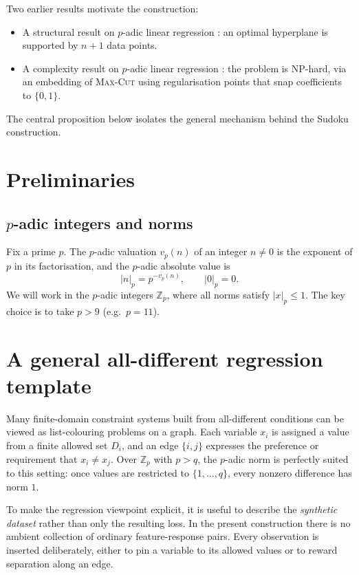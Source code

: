 \documentclass[11pt]{article}
\begin{document}
Two earlier results motivate the construction:
\begin{itemize}
    \item A structural result on $p$-adic linear regression \cite{baker2025padic}: an optimal hyperplane is supported by $n+1$ data points.
    \item A complexity result on $p$-adic linear regression \cite{baker2026nphard}: the problem is NP-hard, via an embedding of \textsc{Max-Cut} using regularisation points that snap coefficients to $\{0,1\}$.
\end{itemize}
The central proposition below isolates the general mechanism behind the Sudoku construction.

\section{Preliminaries}

\subsection{$p$-adic integers and norms}
Fix a prime $p$. The $p$-adic valuation $v_p(n)$ of an integer $n\neq 0$ is the exponent of $p$ in its factorisation, and the $p$-adic absolute value is
\[
|n|_p = p^{-v_p(n)}, \qquad |0|_p = 0.
\]
We will work in the $p$-adic integers $\mathbb{Z}_p$, where all norms satisfy $|x|_p\le 1$. The key choice is to take $p>9$ (e.g.\ $p=11$).

\section{A general all-different regression template}
Many finite-domain constraint systems built from all-different conditions can be viewed as list-colouring problems on a graph. Each variable $x_i$ is assigned a value from a finite allowed set $D_i$, and an edge $\{i,j\}$ expresses the preference or requirement that $x_i\neq x_j$. Over $\mathbb{Z}_p$ with $p>q$, the $p$-adic norm is perfectly suited to this setting: once values are restricted to $\{1,\dots,q\}$, every nonzero difference has norm $1$.

To make the regression viewpoint explicit, it is useful to describe the \emph{synthetic dataset} rather than only the resulting loss. In the present construction there is no ambient collection of ordinary feature-response pairs. Every observation is inserted deliberately, either to pin a variable to its allowed values or to reward separation along an edge.
\end{document}
